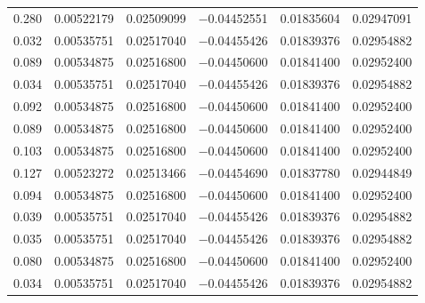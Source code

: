 \begin{table}[p]
\begin{tabularx}{\textwidth}{l *{5}{C}}
        \OtherEmbedding{} \num{0.280} & \num{0.00522179} & \num{0.02509099} & \num{-0.04452551} & \num{0.01835604} & \num{0.02947091} \\
        \FastEmbedding{} \num{0.032} & \num{0.00535751} & \num{0.02517040} & \num{-0.04455426} & \num{0.01839376} & \num{0.02954882} \\
        \NormalEmbedding{} \num{0.089} & \num{0.00534875} & \num{0.02516800} & \num{-0.04450600} & \num{0.01841400} & \num{0.02952400} \\
        \FastEmbedding{} \num{0.034} & \num{0.00535751} & \num{0.02517040} & \num{-0.04455426} & \num{0.01839376} & \num{0.02954882} \\
        \NormalEmbedding{} \num{0.092} & \num{0.00534875} & \num{0.02516800} & \num{-0.04450600} & \num{0.01841400} & \num{0.02952400} \\
        \NormalEmbedding{} \num{0.089} & \num{0.00534875} & \num{0.02516800} & \num{-0.04450600} & \num{0.01841400} & \num{0.02952400} \\
        \NormalEmbedding{} \num{0.103} & \num{0.00534875} & \num{0.02516800} & \num{-0.04450600} & \num{0.01841400} & \num{0.02952400} \\
        \OtherEmbedding{} \num{0.127} & \num{0.00523272} & \num{0.02513466} & \num{-0.04454690} & \num{0.01837780} & \num{0.02944849} \\
        \NormalEmbedding{} \num{0.094} & \num{0.00534875} & \num{0.02516800} & \num{-0.04450600} & \num{0.01841400} & \num{0.02952400} \\
        \FastEmbedding{} \num{0.039} & \num{0.00535751} & \num{0.02517040} & \num{-0.04455426} & \num{0.01839376} & \num{0.02954882} \\
        \FastEmbedding{} \num{0.035} & \num{0.00535751} & \num{0.02517040} & \num{-0.04455426} & \num{0.01839376} & \num{0.02954882} \\
        \NormalEmbedding{} \num{0.080} & \num{0.00534875} & \num{0.02516800} & \num{-0.04450600} & \num{0.01841400} & \num{0.02952400} \\
        \FastEmbedding{} \num{0.034} & \num{0.00535751} & \num{0.02517040} & \num{-0.04455426} & \num{0.01839376} & \num{0.02954882} \\
        \bottomrule
    \end{tabularx}
\end{table}

